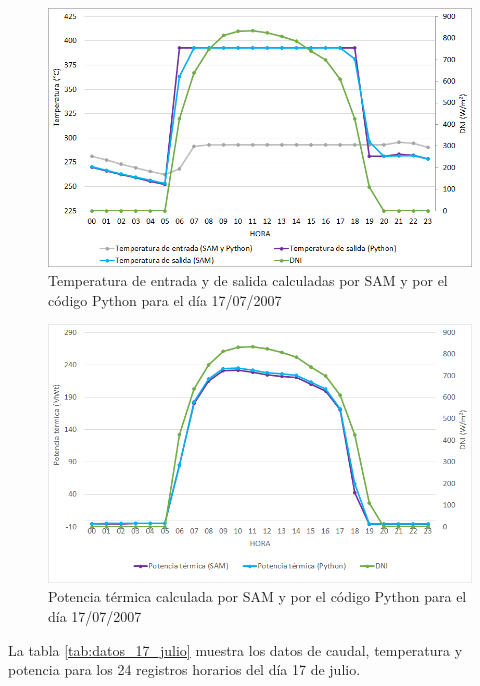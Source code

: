 \begin{figure}[H]
\includegraphics[width=0.9\linewidth]{images/177temperatura.png}
\caption{Temperatura de entrada y de salida calculadas por SAM y por el código Python para el día 17/07/2007} 
\label{fig:177temperatura}
\end{figure}

\begin{figure}[H]
\includegraphics[width=0.9\linewidth]{images/177potencia.png}
\caption{Potencia térmica calculada por SAM y por el código Python para el día 17/07/2007} 
\label{fig:177potencia}
\end{figure}

La tabla \ref{tab:datos_17_julio} muestra los datos de caudal, temperatura y potencia para los 24 registros horarios del día 17 de julio.

